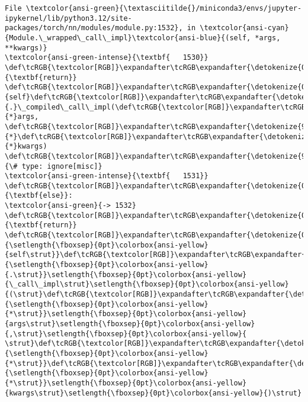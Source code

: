 \documentclass[11pt]{article}
\begin{document}
\begin{Verbatim}[commandchars=\\\{\}, frame=single, framerule=2mm, rulecolor=\color{outerrorbackground}]
File \textcolor{ansi-green}{\textasciitilde{}/miniconda3/envs/jupyter-ipykernel/lib/python3.12/site-packages/torch/nn/modules/module.py:1532}, in \textcolor{ansi-cyan}{Module.\_wrapped\_call\_impl}\textcolor{ansi-blue}{(self, *args, **kwargs)}
\textcolor{ansi-green-intense}{\textbf{   1530}}     \def\tcRGB{\textcolor[RGB]}\expandafter\tcRGB\expandafter{\detokenize{0,135,0}}{\textbf{return}} \def\tcRGB{\textcolor[RGB]}\expandafter\tcRGB\expandafter{\detokenize{0,135,0}}{self}\def\tcRGB{\textcolor[RGB]}\expandafter\tcRGB\expandafter{\detokenize{98,98,98}}{.}\_compiled\_call\_impl(\def\tcRGB{\textcolor[RGB]}\expandafter\tcRGB\expandafter{\detokenize{98,98,98}}{*}args, \def\tcRGB{\textcolor[RGB]}\expandafter\tcRGB\expandafter{\detokenize{98,98,98}}{*}\def\tcRGB{\textcolor[RGB]}\expandafter\tcRGB\expandafter{\detokenize{98,98,98}}{*}kwargs)  \def\tcRGB{\textcolor[RGB]}\expandafter\tcRGB\expandafter{\detokenize{95,135,135}}{\# type: ignore[misc]}
\textcolor{ansi-green-intense}{\textbf{   1531}} \def\tcRGB{\textcolor[RGB]}\expandafter\tcRGB\expandafter{\detokenize{0,135,0}}{\textbf{else}}:
\textcolor{ansi-green}{-> 1532}     \def\tcRGB{\textcolor[RGB]}\expandafter\tcRGB\expandafter{\detokenize{0,135,0}}{\textbf{return}} \def\tcRGB{\textcolor[RGB]}\expandafter\tcRGB\expandafter{\detokenize{0,135,0}}{\setlength{\fboxsep}{0pt}\colorbox{ansi-yellow}{self\strut}}\def\tcRGB{\textcolor[RGB]}\expandafter\tcRGB\expandafter{\detokenize{98,98,98}}{\setlength{\fboxsep}{0pt}\colorbox{ansi-yellow}{.\strut}}\setlength{\fboxsep}{0pt}\colorbox{ansi-yellow}{\_call\_impl\strut}\setlength{\fboxsep}{0pt}\colorbox{ansi-yellow}{(\strut}\def\tcRGB{\textcolor[RGB]}\expandafter\tcRGB\expandafter{\detokenize{98,98,98}}{\setlength{\fboxsep}{0pt}\colorbox{ansi-yellow}{*\strut}}\setlength{\fboxsep}{0pt}\colorbox{ansi-yellow}{args\strut}\setlength{\fboxsep}{0pt}\colorbox{ansi-yellow}{,\strut}\setlength{\fboxsep}{0pt}\colorbox{ansi-yellow}{ \strut}\def\tcRGB{\textcolor[RGB]}\expandafter\tcRGB\expandafter{\detokenize{98,98,98}}{\setlength{\fboxsep}{0pt}\colorbox{ansi-yellow}{*\strut}}\def\tcRGB{\textcolor[RGB]}\expandafter\tcRGB\expandafter{\detokenize{98,98,98}}{\setlength{\fboxsep}{0pt}\colorbox{ansi-yellow}{*\strut}}\setlength{\fboxsep}{0pt}\colorbox{ansi-yellow}{kwargs\strut}\setlength{\fboxsep}{0pt}\colorbox{ansi-yellow}{)\strut}


\end{Verbatim}
\end{document}
